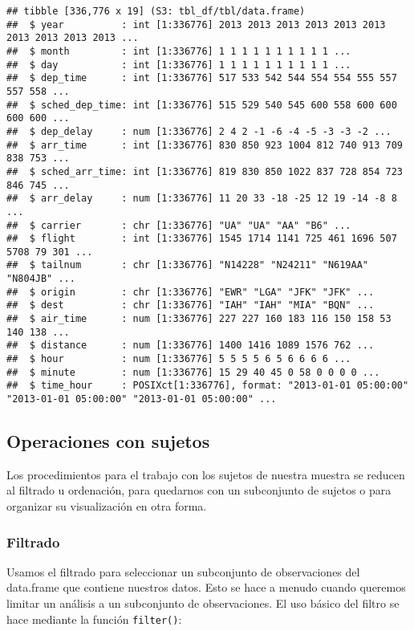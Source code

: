 \documentclass[
]{book}
\begin{document}
\begin{verbatim}
## tibble [336,776 x 19] (S3: tbl_df/tbl/data.frame)
##  $ year          : int [1:336776] 2013 2013 2013 2013 2013 2013 2013 2013 2013 2013 ...
##  $ month         : int [1:336776] 1 1 1 1 1 1 1 1 1 1 ...
##  $ day           : int [1:336776] 1 1 1 1 1 1 1 1 1 1 ...
##  $ dep_time      : int [1:336776] 517 533 542 544 554 554 555 557 557 558 ...
##  $ sched_dep_time: int [1:336776] 515 529 540 545 600 558 600 600 600 600 ...
##  $ dep_delay     : num [1:336776] 2 4 2 -1 -6 -4 -5 -3 -3 -2 ...
##  $ arr_time      : int [1:336776] 830 850 923 1004 812 740 913 709 838 753 ...
##  $ sched_arr_time: int [1:336776] 819 830 850 1022 837 728 854 723 846 745 ...
##  $ arr_delay     : num [1:336776] 11 20 33 -18 -25 12 19 -14 -8 8 ...
##  $ carrier       : chr [1:336776] "UA" "UA" "AA" "B6" ...
##  $ flight        : int [1:336776] 1545 1714 1141 725 461 1696 507 5708 79 301 ...
##  $ tailnum       : chr [1:336776] "N14228" "N24211" "N619AA" "N804JB" ...
##  $ origin        : chr [1:336776] "EWR" "LGA" "JFK" "JFK" ...
##  $ dest          : chr [1:336776] "IAH" "IAH" "MIA" "BQN" ...
##  $ air_time      : num [1:336776] 227 227 160 183 116 150 158 53 140 138 ...
##  $ distance      : num [1:336776] 1400 1416 1089 1576 762 ...
##  $ hour          : num [1:336776] 5 5 5 5 6 5 6 6 6 6 ...
##  $ minute        : num [1:336776] 15 29 40 45 0 58 0 0 0 0 ...
##  $ time_hour     : POSIXct[1:336776], format: "2013-01-01 05:00:00" "2013-01-01 05:00:00" "2013-01-01 05:00:00" ...
\end{verbatim}

\hypertarget{operaciones-con-sujetos}{%
\subsection{Operaciones con sujetos}\label{operaciones-con-sujetos}}

Los procedimientos para el trabajo con los sujetos de nuestra muestra se reducen al filtrado u ordenación, para quedarnos con un subconjunto de sujetos o para organizar su visualización en otra forma.

\hypertarget{filtrado}{%
\subsubsection{Filtrado}\label{filtrado}}

Usamos el filtrado para seleccionar un subconjunto de observaciones del data.frame que contiene nuestros datos. Esto se hace a menudo cuando queremos limitar un análisis a un subconjunto de observaciones. El uso básico del filtro se hace mediante la función \texttt{filter()}:
\end{document}
